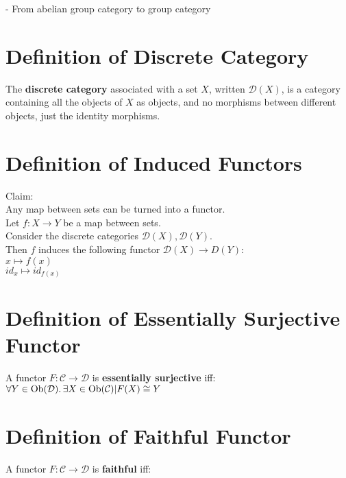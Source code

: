 \documentclass[a4paper, twoside, english, 11pt]{book}
\DeclareMathOperator{\Ob}{Ob}
\newcommand{\C}{\mathcal C}
\newcommand{\D}{\mathcal D}
\begin{document}
- From abelian group category to group category



\section{Definition of Discrete Category}

The \textbf{discrete category} associated with a set $X$, written $\D(X)$, is a category containing all the objects of $X$ as objects, and no morphisms between different objects, just the identity morphisms.



\section{Definition of Induced Functors}

Claim: \\
Any map between sets can be turned into a functor. \\

\noindent
Let $f : X \rightarrow Y$ be a map between sets. \\

\noindent
Consider the discrete categories $\D(X), \D(Y)$. \\

\noindent
Then $f$ induces the following functor $\D(X) \rightarrow D(Y)$: \\
\indent
$x \mapsto f(x)$ \\
\indent
$id_x \mapsto id_{f(x)}$



\section{Definition of Essentially Surjective Functor}

A functor $F : \C \rightarrow \D$ is \textbf{essentially surjective} iff: \\

$\forall Y \in \Ob(\D) \ldotp \exists X \in \Ob(\C) | F(X) \cong Y$



\section{Definition of Faithful Functor}

A functor $F : \C \rightarrow \D$ is \textbf{faithful} iff: \\
\end{document}
